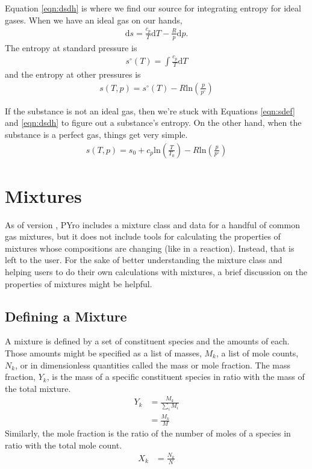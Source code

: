 Equation \ref{eqn:dsdh} is where we find our source for integrating entropy for ideal gases.  When we have an ideal gas on our hands,
\begin{align}
\mathrm{d}s = \frac{c_p}{T} \mathrm{d}T - \frac{R}{p}\mathrm{d}p.
\end{align}
The entropy at standard pressure is 
\begin{align}
s^\circ (T) = \int \frac{c_p}{T} \mathrm{d}T
\end{align}
and the entropy at other pressures is
\begin{align}
s(T,p) = s^\circ (T) - R \mathrm{ln}\left(\frac{p}{p^\circ}\right)
\end{align}

If the substance is not an ideal gas, then we're stuck with Equations \ref{eqn:sdef} and \ref{eqn:dsdh} to figure out a substance's entropy.  On the other hand, when the substance is a perfect gas, things get very simple.
\begin{align}
s(T,p) = s_0 + c_p\mathrm{ln}\left(\frac{T}{T_0}\right) - R \mathrm{ln}\left(\frac{p}{p^\circ}\right)
\end{align}

\section{Mixtures}
As of version \version, PYro includes a mixture class and data for a handful of common gas mixtures, but it does not include tools for calculating the properties of mixtures whose compositions are changing (like in a reaction).  Instead, that is left to the user.  For the sake of better understanding the mixture class and helping users to do their own calculations with mixtures, a brief discussion on the properties of mixtures might be helpful.

\subsection{Defining a Mixture}
A mixture is defined by a set of constituent species and the amounts of each.  Those amounts might be specified as a list of masses, $M_k$, a list of mole counts, $N_k$, or in dimensionless quantities called the mass or mole fraction.  The mass fraction, $Y_k$, is the mass of a specific constituent species in ratio with the mass of the total mixture.
\begin{align}
Y_k &= \frac{M_k}{\sum_i M_i}\nonumber\\
 &= \frac{M_k}{M}
\end{align}
Similarly, the mole fraction is the ratio of the number of moles of a species in ratio with the total mole count.
\begin{align}
X_k &= \frac{N_k}{N}
\end{align}

